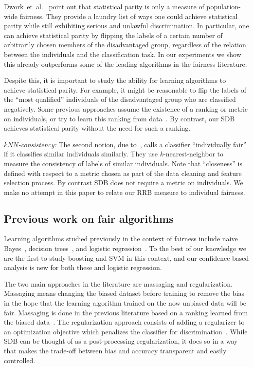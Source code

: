 \documentclass[twoside,leqno,twocolumn]{article}
\begin{document}
Dwork~et~al.~\cite{DworkHPR12} point out that statistical parity is only a
measure of population-wide fairness. They provide a laundry list
of ways one could achieve statistical parity while still exhibiting serious and
unlawful discrimination. In particular, one can achieve statistical parity by
flipping the labels of a certain number of arbitrarily chosen members of the
disadvantaged group, regardless of the relation between the individuals and the
classification task. In our experiments we show this already outperforms some
of the leading algorithms in the fairness literature.

Despite this, it is important to study the ability for learning algorithms to
achieve statistical parity.  For example, it might be
reasonable to flip the labels of the ``most qualified'' individuals of the
disadvantaged group who are classified negatively. Some previous approaches
assume the existence of a ranking or metric on individuals, or try to learn
this ranking from data~\cite{KamiranC09,DworkHPR12}. By contrast, our SDB
achieves statistical parity without the need for such a ranking.

\emph{$kNN$-consistency:} The second notion, due to~\cite{DworkHPR12}, calls a
classifier ``individually fair'' if it classifies similar individuals
similarly. They use $k$-nearest-neighbor to measure the consistency of labels
of similar individuals. Note that ``closeness'' is defined with respect to a
metric chosen as part of the data cleaning and feature selection process. By
contrast SDB does not require a metric on individuals. We make no attempt in
this paper to relate our RRB measure to individual fairness.

\subsection{Previous work on fair algorithms} Learning algorithms studied
previously in the context of fairness include naive Bayes~\cite{CaldersV10},
decision trees~\cite{KamiranCP10}, and logistic
regression~\cite{KamishimaAAS12}.  To the best of our knowledge we are the
first to study boosting and SVM in this context, and our confidence-based
analysis is new for both these and logistic regression. 

The two main approaches in the literature are massaging and regularization.
Massaging means changing the biased dataset before training to remove the bias
in the hope that the learning algorithm trained on the now unbiased data will
be fair.  Massaging is done in the previous literature based on a ranking
learned from the biased data~\cite{KamiranC09}. The regularization
approach consists of adding a regularizer to an optimization objective which
penalizes the classifier for discrimination~\cite{KamashimaAS11}. While SDB can
be thought of as a post-processing regularization, it does so in a way that
makes the trade-off between bias and accuracy transparent and easily
controlled. 
\end{document}

